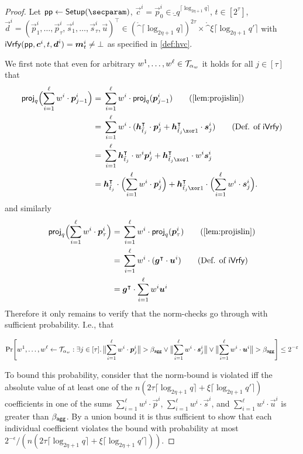 \begin{proof}
Let $\params \gets \setup(\secparam)$, $\vec{c}^i = \vec{p}_0^i \in \ring_q^{\lceil\log_{2\eta+1} q\rceil}$, $t\in[2^\tau]$, $\vec{d}^i = (\vec{p}^i_1,\dots,\vec{p}^i_{\tau},\vec{s}^i_1, \dots, \vec{s}^i_{\tau},\vec{u})^\intercal\in (\ring^{\lceil\log_{2\eta+1} q\rceil})^{2\tau} \times \ring^{\xi\lceil\log_{2\eta+1} q'\rceil}$ with $\mathsf{iVrfy}(\mathsf{pp},\boldsymbol{c}^i,t,\boldsymbol{d}^i) = \boldsymbol{m}_t^i \neq \bot$
as specified in \autoref{def:hvc}.

We first note that even for arbitrary $w^1,\dots,w^{\ell}\in\mathcal{T}_{\alpha_w}$ it holds for all $j\in[\tau]$ that
\begin{align*}
  \proj_q\Bigl(\sum_{i=1}^{\ell}w^i\cdot\vec{p}_{j-1}^i\Bigr) ={}&\sum_{i=1}^{\ell}w^i\cdot\proj_q(\vec{p}_{j-1}^i)\tag{\autoref{lem:projislin}}\\
  ={}&\sum_{i=1}^{\ell}w^i\cdot(\vec{h}_{\tilde t_j}^\intercal\cdot \vec{p}^i_{j} + \vec{h}_{\tilde t_j\xor 1}^\intercal \cdot \vec{s}^i_{j})\tag{Def. of $\iverify$}\\
  ={}&\sum_{i=1}^{\ell}\vec{h}_{\tilde t_j}^\intercal\cdot w^i \vec{p}^i_{j} + \vec{h}_{\tilde t_j\xor 1}^\intercal\cdot w^i  \vec{s}^i_{j}\\  
  ={}& \vec{h}_{\tilde t_j}^\intercal\cdot \Bigl(\sum_{i=1}^{\ell}w^i\cdot\vec{p}^i_{j}\Bigr) + \vec{h}_{\tilde t_j \xor 1}^\intercal \cdot \Bigl(\sum_{i=1}^{\ell}w^i\cdot\vec{s}^i_{j}\Bigr).
\end{align*}
and similarly
\begin{align*}
  \proj_q\Bigl(\sum_{i=1}^{\ell}w^i\cdot\vec{p}_{\tau}^i\Bigr) ={}&\sum_{i=1}^{\ell}w^i\cdot\proj_q(\vec{p}_{\tau}^i)\tag{\autoref{lem:projislin}}\\
  ={}&\sum_{i=1}^{\ell}w^i\cdot(\vec{g}^\intercal\cdot \vec{u}^i)\tag{Def. of $\iverify$}\\
  ={}&\vec{g}^\intercal\cdot\sum_{i=1}^{\ell}w^i\vec{u}^i 
\end{align*}
Therefore it only remains to verify that the norm-checks go through with sufficient probability. I.e., that

\[
    \Pr\mleft[
      w^1,\dots,w^{\ell} \gets \tern_{\alpha_w} : \exists j\in[\tau]\ldotp
      \bigl\Vert\sum_{i=1}^{\ell}w^i\cdot \vec{p}_j^i\bigr\Vert > \bagg \lor \bigl\Vert\sum_{i=1}^{\ell}w^i\cdot \vec{s}_j^i\bigr\Vert \lor \bigl\Vert\sum_{i=1}^{\ell}w^i\cdot\vec{u}^i\bigr\Vert > \bagg
    \mright] \leq 2^{-\varepsilon}
  \]
  
  To bound this probability, consider that the norm-bound is violated iff the absolute value of at least one of the $n(2\tau\lceil\log_{2\eta+1} q\rceil  + \xi\lceil\log_{2\eta+1} q'\rceil)$ coefficients in one of the sums $\sum_{i=1}^{\ell} w^i\cdot\vec{p}^i$, $\sum_{i=1}^{\ell} w^i\cdot\vec{s}^i$, and $\sum_{i=1}^{\ell} w^i\cdot\vec{u}^i$ is greater than $\beta_{\mathsf{agg}}$.
  By a union bound it is thus sufficient to show that each individual coefficient violates the bound with probability at most $2^{-\epsilon}/(n(2\tau\lceil\log_{2\eta+1} q\rceil + \xi\lceil\log_{2\eta+1} q'\rceil))$.
  

\end{proof}
